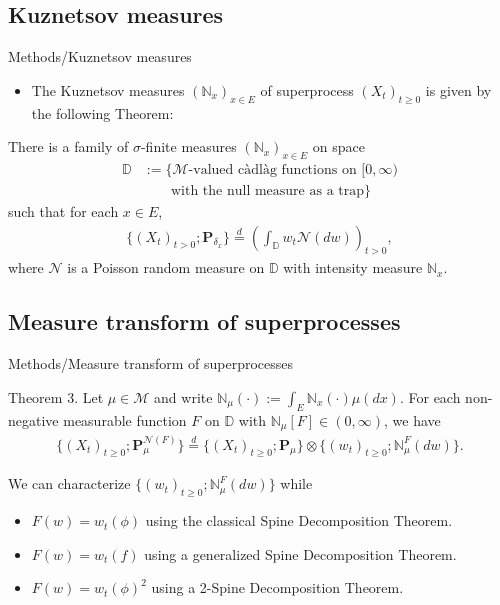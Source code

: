 \documentclass[xcolor=dvipsnames]{beamer}
\begin{document}
\subsection{Kuznetsov measures}
\begin{frame}{Methods/Kuznetsov measures}
\begin{itemize}
\item
  The {\color{red} Kuznetsov measures $(\mathbb N_x)_{x\in E}$} of superprocess $(X_t)_{t\geq 0}$ is given by the following Theorem:
\end{itemize}
  \begin{theorem}[Li (2011) Theorem 8.24]
There is a family of $\sigma$-finite measures {\color{red} $(\mathbb N_x)_{x\in E}$} on space
\begin{align}
  \mathbb D &:= \{\mathcal M\text{-valued c\`adl\`ag functions on $[0,\infty)$} 
\\ &\qquad \text{with the null measure as a trap}\} 
\end{align}
such that for each $x\in E$, 
\begin{align}
\{(X_t)_{t>0}; \mathbf P_{\delta_x} \}
  \overset{d}{=} \left( \int_{\mathbb D} w_t \mathcal N(dw) \right)_{t>0},
\end{align}
where {\color{red} $\mathcal N$} is a Poisson random measure on $\mathbb D$ with intensity measure {\color{red} $\mathbb N_x$}.
\end{theorem}
\end{frame}

\subsection{Measure transform of superprocesses}
\begin{frame}{Methods/Measure transform of superprocesses}
\begin{block}{Theorem 3.}
  Let $\mu \in \mathcal M$ and write $\mathbb N_\mu(\cdot) := \int_{E} \mathbb N_x(\cdot)\mu(dx)$.
For each non-negative measurable function $F$ on $\mathbb D$ with $\mathbb N_\mu[F] \in (0,\infty)$, we have 
\begin{align}
\{(X_t)_{t\geq 0}; \mathbf P^{\mathcal N(F)}_\mu\} 
\overset{d}{=} \{(X_t)_{t\geq 0}; \mathbf P_\mu\} \otimes \{(w_t)_{t \geq 0}; \mathbb N^F_\mu(dw)\}.
\end{align}
\end{block}
    We can characterize $\{(w_t)_{t \geq 0}; \mathbb N^F_\mu(dw)\}$ while
    \begin{itemize}
    \item 
      $F(w) = w_t(\phi)$ using the {\color{red} classical Spine Decomposition Theorem}.
    \item 
      $F(w) = w_t(f)$ using a {\color{red} generalized Spine Decomposition Theorem}.
    \item 
      $F(w) = w_t(\phi)^2$ using a {\color{red} 2-Spine Decomposition Theorem.}
    \end{itemize}
\end{frame}
\end{document}
